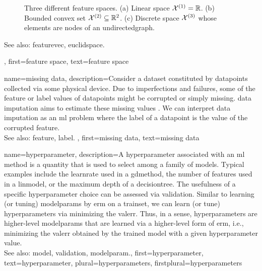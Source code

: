 {{\begin{figure}[H]
		\caption{Three different \gls{feature} spaces. (a) Linear space $\mathcal{X}^{(1)} = \mathbb{R}$. (b) Bounded 
			\gls{convex} set $\mathcal{X}^{(2)} \subseteq \mathbb{R}^{2}$. (c) Discrete space 
			$\mathcal{X}^{(3)}$ whose elements are nodes of an \gls{undirectedgraph}. \label{fig_featurespace_dict}}
		\end{figure}
		See also: \gls{featurevec}, \gls{euclidspace}.},
	first={feature space},
	text={feature space}  
}

{name={missing data},
	description={Consider a \gls{dataset} constituted by \glspl{datapoint} collected via 
		some physical \gls{device}. Due to imperfections and failures, some of the \gls{feature} 
		or \gls{label} values of \glspl{datapoint} might be corrupted or simply missing. 
		\Gls{data} imputation aims to estimate these missing values \cite{Abayomi2008DiagnosticsFM}. 
		We can interpret \gls{data} imputation as an \gls{ml} problem where the \gls{label} of a \gls{datapoint} is 
		the value of the corrupted \gls{feature}.
				\\
		See also: \gls{feature}, \gls{label}. },
	first={missing data},
	text={missing data}  
}

{name={hyperparameter},
	description={A hyperparameter associated with an \gls{ml} method is 
		a quantity that is used to select among a family of \glspl{model}. 
		Typical examples include the \gls{learnrate} used in a \gls{gdmethod}, 
		the number of \glspl{feature} used in a \gls{linmodel}, or the 
		\gls{maximum} depth of a \gls{decisiontree}. The usefulness of a specific 
		hyperparameter choice can be assessed via \gls{validation}. Similar 
		to learning (or tuning) \glspl{modelparam} by \gls{erm} on a \gls{trainset}, 
		we can learn (or tune) hyperparameters via minimizing the \gls{valerr}. Thus, 
		in a sense, hyperparameters are higher-level \glspl{modelparam} that are learned 
		via a higher-level form of \gls{erm}, i.e., minimizing the \gls{valerr} obtained by 
		the trained \gls{model} with a given hyperparameter value. 
			\\ 
		See also: \gls{model}, \gls{validation}, \gls{modelparam}.},
	first={hyperparameter},
	text={hyperparameter},
	plural={hyperparameters},
	firstplural={hyperparameters}
}

